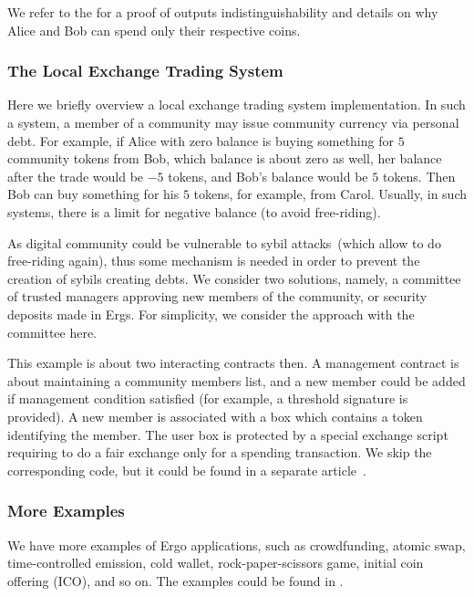  We refer to the \cite{ergoAdvTutorial} for a proof of outputs indistinguishability and details on why
 Alice and Bob can spend only their respective coins.

\subsubsection{The Local Exchange Trading System}
 \label{sec:platform}


 Here we briefly overview a local exchange trading system implementation. In such a system, a member of a community may
 issue community currency via personal debt. For example, if Alice with zero balance is buying something for $5$
 community tokens from Bob, which balance is about zero as well, her balance after the trade would be $-5$ tokens, and
 Bob's balance would be $5$ tokens. Then Bob can buy something for his $5$ tokens, for example, from Carol.
 Usually, in such systems, there is a limit for negative balance (to avoid free-riding).

 As digital community could be vulnerable to sybil attacks~(which allow to do free-riding again), thus some mechanism
 is needed in order to prevent the creation of sybils creating debts. We consider two solutions, namely, a committee of
 trusted managers approving new members of the community, or security deposits made in Ergs. For simplicity, we
 consider the approach with the committee here.

 This example is about two interacting contracts then. A management contract is about maintaining a
 community members list, and a new member could be added if management condition satisfied  (for example, a threshold
 signature is provided). A new member is associated with a box which contains a token identifying the member. The user
 box is protected by a special exchange script requiring to do a fair exchange only for a spending transaction.
 We skip the corresponding code, but it could be found in a separate article~\cite{icoTutorial}.

\subsubsection{More Examples}


 We have more examples of Ergo applications, such as crowdfunding, atomic swap, time-controlled emission,
 cold wallet, rock-paper-scissors game, initial coin offering (ICO), and so on. The examples could be
 found in \cite{ergoTutorial, ergoAdvTutorial}.